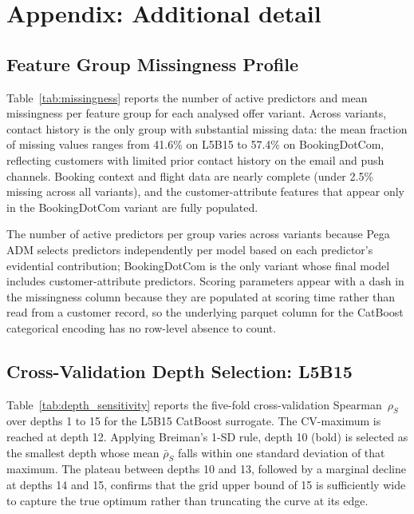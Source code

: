 \documentclass[oneside]{memoir} %
\begin{document}

\newpage
\newpage
\chapter{Appendix: Additional detail}
\appendix
\renewcommand{\thetable}{A.\arabic{table}}
\setcounter{table}{0}
\renewcommand{\thefigure}{A.\arabic{figure}}
\setcounter{figure}{0}
\renewcommand{\thesection}{A.\arabic{section}}

\section{Feature Group Missingness Profile} \label{app:missingness}

Table~\ref{tab:missingness} reports the number of active predictors and mean missingness per feature group for each analysed offer variant. Across variants, contact history is the only group with substantial missing data: the mean fraction of missing values ranges from 41.6\% on L5B15 to 57.4\% on BookingDotCom, reflecting customers with limited prior contact history on the email and push channels. Booking context and flight data are nearly complete (under 2.5\% missing across all variants), and the customer-attribute features that appear only in the BookingDotCom variant are fully populated.

The number of active predictors per group varies across variants because Pega ADM selects predictors independently per model based on each predictor's evidential contribution; BookingDotCom is the only variant whose final model includes customer-attribute predictors. Scoring parameters appear with a dash in the missingness column because they are populated at scoring time rather than read from a customer record, so the underlying parquet column for the CatBoost categorical encoding has no row-level absence to count.




\section{Cross-Validation Depth Selection: L5B15} \label{app:cv_depth}

Table~\ref{tab:depth_sensitivity} reports the five-fold cross-validation Spearman~$\rho_S$ over depths 1 to 15 for the L5B15 CatBoost surrogate. The CV-maximum is reached at depth 12. Applying Breiman's 1-SD rule, depth 10 (bold) is selected as the smallest depth whose mean $\bar{\rho}_S$ falls within one standard deviation of that maximum. The plateau between depths 10 and 13, followed by a marginal decline at depths 14 and 15, confirms that the grid upper bound of 15 is sufficiently wide to capture the true optimum rather than truncating the curve at its edge.
\end{document}
